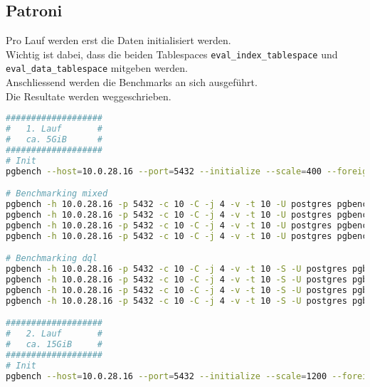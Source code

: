 
\begin{flushleft}
    \subsection{Patroni}
    \label{subsec:patroni_benchmarking_commands}
    Pro Lauf werden erst die Daten initialisiert werden.\\
    Wichtig ist dabei, dass die beiden Tablespaces \texttt{eval\_index\_tablespace} und \texttt{eval\_data\_tablespace} mitgeben werden.\\
    Anschliessend werden die Benchmarks an sich ausgeführt.\\
    Die Resultate werden weggeschrieben.
\lstset{style=gra_codestyle}
\begin{lstlisting}[language=bash, caption=Patroni - Benchmarking-Commands,captionpos=b,label={lst:patroni-benchmarking-commands},breaklines=true]
###################
#   1. Lauf       #
#   ca. 5GiB      #
###################
# Init
pgbench --host=10.0.28.16 --port=5432 --initialize --scale=400 --foreign-keys --fillfactor=100 --username=dtgvpf --index-tablespace=eval_index_tablespace --tablespace=eval_data_tablespace --username=postgres pgbench_eval_bench

# Benchmarking mixed
pgbench -h 10.0.28.16 -p 5432 -c 10 -C -j 4 -v -t 10 -U postgres pgbench_eval_bench > /home/itgramic/1_1_patroni_mixed_benchmark.txt
pgbench -h 10.0.28.16 -p 5432 -c 10 -C -j 4 -v -t 10 -U postgres pgbench_eval_bench > /home/itgramic/1_2_patroni_mixed_benchmark.txt
pgbench -h 10.0.28.16 -p 5432 -c 10 -C -j 4 -v -t 10 -U postgres pgbench_eval_bench > /home/itgramic/1_3_patroni_mixed_benchmark.txt
pgbench -h 10.0.28.16 -p 5432 -c 10 -C -j 4 -v -t 10 -U postgres pgbench_eval_bench > /home/itgramic/1_4_patroni_mixed_benchmark.txt

# Benchmarking dql
pgbench -h 10.0.28.16 -p 5432 -c 10 -C -j 4 -v -t 10 -S -U postgres pgbench_eval_bench > /home/itgramic/1_1_patroni_dql_benchmark.txt
pgbench -h 10.0.28.16 -p 5432 -c 10 -C -j 4 -v -t 10 -S -U postgres pgbench_eval_bench > /home/itgramic/1_2_patroni_dql_benchmark.txt
pgbench -h 10.0.28.16 -p 5432 -c 10 -C -j 4 -v -t 10 -S -U postgres pgbench_eval_bench > /home/itgramic/1_3_patroni_dql_benchmark.txt
pgbench -h 10.0.28.16 -p 5432 -c 10 -C -j 4 -v -t 10 -S -U postgres pgbench_eval_bench > /home/itgramic/1_4_patroni_dql_benchmark.txt

###################
#   2. Lauf       #
#   ca. 15GiB     #
###################
# Init
pgbench --host=10.0.28.16 --port=5432 --initialize --scale=1200 --foreign-keys --fillfactor=100 --username=dtgvpf --index-tablespace=eval_index_tablespace --tablespace=eval_data_tablespace --username=postgres pgbench_eval_bench


\end{lstlisting}
\end{flushleft}
